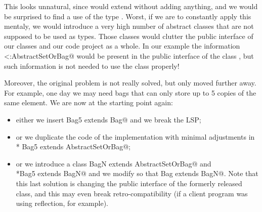 This looks unnatural, since \Q@Set@ would extend \Q@AbstractSetOrBag@ without adding anything,
and we would be surprised to find a use of the type \Q@AbstractSetOrBag@.
Worst, if we are to constantly apply this mentaly, we would introduce a very high number
of abstract classes that are not supposed to be used as types. Those classes would clutter the 
public interface of our classes and our code project as a whole.
In our example the information \Q@Set<:AbstractSetOrBag@ would be present in the public interface
of the class \Q@Set@, but such information is not needed to use the class properly!

Moreover, the original problem is not really solved, but only moved 
further away. For example, one day  we may need bags that can only store up to 5 copies of the same element.
We are now at the starting point again:
\begin{itemize}
\item either we insert \Q@class Bag5 extends Bag@ and we break the LSP; 
\item or we duplicate the code of the \Q@Bag@ implementation with minimal
  adjustments in \\* \Q@class Bag5 extends AbstractSetOrBag@;
\item or we introduce a
\Q@abstract class BagN extends AbstractSetOrBag@ and \\*\Q@class Bag5 extends BagN@
and we modify \Q@Bag@ so that  \Q@class Bag extends BagN@.
Note that this last solution is changing the public interface of the formerly released \Q@Bag@ class, and
this may even break retro-compatibility (if a client program was using
reflection, for example).
\end{itemize}

